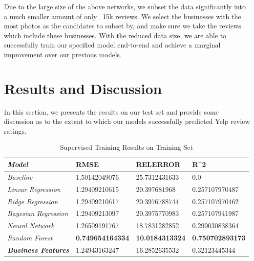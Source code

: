 \documentclass[letterpaper, 10 pt, conference]{ieeeconf}  %
\begin{document}
Due to the large size of the above networks, we subset the data significantly into a much smaller amount of only ~15k reviews. We select the businesses with the most photos as the candidates to subset by, and make sure we take the reviews which include these businesses. With the reduced data size, we are able to successfully train our specified model end-to-end and achieve a marginal improvement over our previous models.


\section{Results and Discussion}
In this section, we presents the results on our test set and provide some discussion as to the extent to which our models successfully predicted Yelp review ratings.

{\renewcommand{\arraystretch}{2}%
\begin{table}[]
\centering
\caption{Supervised Training Results on Training Set}
\label{table:trainint_set_results}
\begin{tabular}{|l|lll}
\hline
\textit{\textbf{Model}}      & \multicolumn{1}{l|}{\textbf{RMSE}} & \multicolumn{1}{l|}{\textbf{RELERROR}} & \multicolumn{1}{l|}{\textbf{R\textasciicircum 2}} \\ \hline
\textit{Baseline}            & 1.50142049076                      & 25.7312431633                          & 0.0                                               \\ \cline{1-1}
\textit{Linear Regression}   & 1.29409210615                      & 20.397681968                           & 0.257107970487                                    \\ \cline{1-1}
\textit{Ridge Regression}    & 1.29409210617                      & 20.3976788744                          & 0.257107970462                                    \\ \cline{1-1}
\textit{Bayesian Regression} & 1.29409213097                      & 20.3975770983                          & 0.257107941987                                    \\ \cline{1-1}
\textit{Neural Network}      & 1.26509191767                      & 18.7831282852                          & 0.290030838364                                    \\ \cline{1-1}
\textit{Random Forest}       & \textbf{0.749654164334}            & \textbf{10.0184313324}                 & \textbf{0.750702893173}                           \\ \cline{1-1}
\textit{\textbf{Business Features}}       & 1.24943163247            & 16.2852635532                 & 0.32123445344                           \\ \cline{1-1}
\end{tabular}
\end{table}
}
\end{document}
